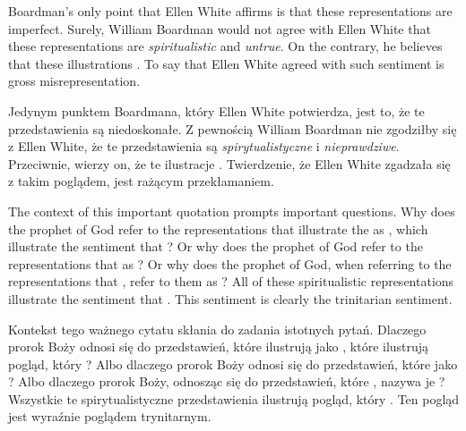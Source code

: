 Boardman’s only point that Ellen White affirms is that these representations are imperfect. Surely, William Boardman would not agree with Ellen White that these representations are \textit{spiritualistic} and \textit{untrue}. On the contrary, he believes that these illustrations . To say that Ellen White agreed with such sentiment is gross misrepresentation.


Jedynym punktem Boardmana, który Ellen White potwierdza, jest to, że te przedstawienia są niedoskonałe. Z pewnością William Boardman nie zgodziłby się z Ellen White, że te przedstawienia są \textit{spirytualistyczne} i \textit{nieprawdziwe}. Przeciwnie, wierzy on, że te ilustracje . Twierdzenie, że Ellen White zgadzała się z takim poglądem, jest rażącym przekłamaniem.


The context of this important quotation prompts important questions. Why does the prophet of God refer to the representations that illustrate the  as , which illustrate the sentiment that ? Or why does the prophet of God refer to the representations that  as ? Or why does the prophet of God, when referring to the representations that , refer to them as ? All of these spiritualistic representations illustrate the sentiment that . This sentiment is clearly the trinitarian sentiment.


Kontekst tego ważnego cytatu skłania do zadania istotnych pytań. Dlaczego prorok Boży odnosi się do przedstawień, które ilustrują  jako , które ilustrują pogląd, który ? Albo dlaczego prorok Boży odnosi się do przedstawień, które  jako ? Albo dlaczego prorok Boży, odnosząc się do przedstawień, które , nazywa je ? Wszystkie te spirytualistyczne przedstawienia ilustrują pogląd, który . Ten pogląd jest wyraźnie poglądem trynitarnym.


